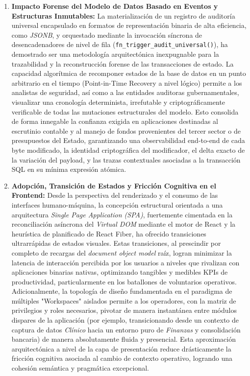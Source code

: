 \begin{enumerate}
    \item \textbf{Impacto Forense del Modelo de Datos Basado en Eventos y Estructuras Inmutables:}
    La materialización de un registro de auditoría universal encapsulado en formatos de representación binaria de alta eficiencia, como \textit{JSONB}, y orquestado mediante la invocación síncrona de desencadenadores de nivel de fila (\texttt{fn\_trigger\_audit\_universal()}), ha demostrado ser una metodología arquitectónica inexpugnable para la trazabilidad y la reconstrucción forense de las transacciones de estado. La capacidad algorítmica de recomponer estados de la base de datos en un punto arbitrario en el tiempo (Point-in-Time Recovery a nivel lógico) permite a los analistas de seguridad, así como a las entidades auditoras gubernamentales, visualizar una cronología determinista, irrefutable y criptográficamente verificable de todas las mutaciones estructurales del modelo. Esto consolida de forma innegable la confianza exigida en aplicaciones destinadas al escrutinio contable y al manejo de fondos provenientes del tercer sector o de presupuestos del Estado, garantizando una observabilidad end-to-end de cada byte modificado, la identidad criptográfica del modificador, el delta exacto de la variación del payload, y las trazas contextuales asociadas a la transacción SQL en su mínima expresión atómica.

    \item \textbf{Adopción, Transición de Estados y Fricción Cognitiva en el Frontend:}
    Desde la perspectiva del renderizado y el consumo de las interfaces humano-máquina, la concepción estructural orientada a una arquitectura \textit{Single Page Application (SPA)}, fuertemente cimentada en la reconciliación asíncrona del \textit{Virtual DOM} mediante el motor de React y la heurística de planificado de React Fiber, ha ofrecido transiciones ultrarrápidas de estados visuales. Estas transiciones, al prescindir por completo de recargas del \textit{document object model} raíz, logran minimizar la latencia de interacción percibida por los usuarios a niveles que rivalizan con aplicaciones binarias nativas, optimizando tangibles y medibles KPIs de productividad, particularmente en los batallones de voluntarios operativos. Adicionalmente, la topología de diseño fundamentada en el paradigma de múltiples "Workspaces" aislados permite a los operadores, con la matriz de privilegios y roles necesarios, pivotar de manera instantánea entre módulos dispares de la aplicación (por ejemplo, transicionando desde un contexto de captura de datos \textit{Clínico} hacia un entorno puro de \textit{Finanzas} y consolidación bancaria) de manera absolutamente fluida y presencial. Esta aproximación arquitectónica a nivel de la capa de presentación reduce drásticamente la fricción cognitiva asociada al cambio de contexto operativo, logrando una cohesión semántica y pragmática excepcional.


\end{enumerate}
